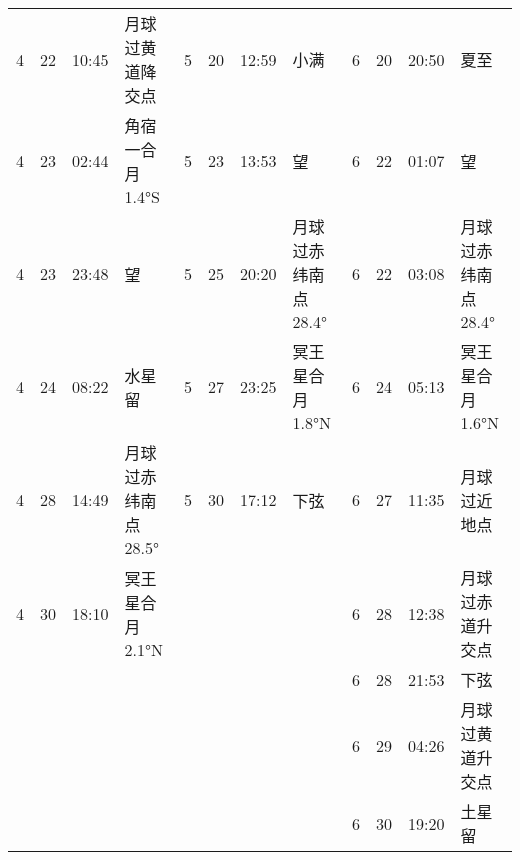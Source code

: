 \begin{tabular}{llll|llll|llll}
4 & 22 & 10:45 & 月球过黄道降交点 & 5 & 20 & 12:59 & 小满 & 6 & 20 & 20:50 & 夏至 \tabularnewline
4 & 23 & 02:44 & 角宿一合月 1.4°S & 5 & 23 & 13:53 & 望 & 6 & 22 & 01:07 & 望 \tabularnewline
4 & 23 & 23:48 & 望 & 5 & 25 & 20:20 & 月球过赤纬南点 28.4° & 6 & 22 & 03:08 & 月球过赤纬南点 28.4° \tabularnewline
4 & 24 & 08:22 & 水星留 & 5 & 27 & 23:25 & 冥王星合月 1.8°N & 6 & 24 & 05:13 & 冥王星合月 1.6°N \tabularnewline
4 & 28 & 14:49 & 月球过赤纬南点 28.5° & 5 & 30 & 17:12 & 下弦 & 6 & 27 & 11:35 & 月球过近地点 \tabularnewline
4 & 30 & 18:10 & 冥王星合月 2.1°N &  &  &  &  & 6 & 28 & 12:38 & 月球过赤道升交点 \tabularnewline
 &  &  &  &  &  &  &  & 6 & 28 & 21:53 & 下弦 \tabularnewline
 &  &  &  &  &  &  &  & 6 & 29 & 04:26 & 月球过黄道升交点 \tabularnewline
 &  &  &  &  &  &  &  & 6 & 30 & 19:20 & 土星留 \tabularnewline
\hline \end{tabular}

